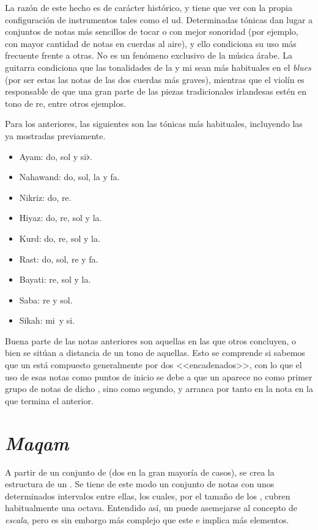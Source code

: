 La razón de este hecho es de carácter histórico, y tiene que ver con la propia configuración de instrumentos tales como el ud. Determinadas tónicas dan lugar a conjuntos de notas más sencillos de tocar o con mejor sonoridad (por ejemplo, con mayor cantidad de notas en cuerdas al aire), y ello condiciona su uso más frecuente frente a otras. No es un fenómeno exclusivo de la música árabe. La guitarra condiciona que las tonalidades de la y mi sean más habituales en el \emph{blues} (por ser estas las notas de las dos cuerdas más graves), mientras que el violín es responsable de que una gran parte de las piezas tradicionales irlandesas estén en tono de re, entre otros ejemplos.

Para los \ashnas anteriores, las siguientes son las tónicas más habituales, incluyendo las ya mostradas previamente.

\begin{center}
\begin{itemize}
\item Ayam: do, sol y si$\flat$.
\item Nahawand: do, sol, la y fa.
\item Nikriz: do, re.
\item Hiyaz: do, re, sol y la.
\item Kurd: do, re, sol y la.
\item Rast: do, sol, re y fa.
\item Bayati: re, sol y la.
\item Saba: re y sol.
\item Sikah: mi\hflat\ y si\hflat.
\end{itemize}
\end{center}

Buena parte de las notas anteriores son aquellas en las que otros \ashnas concluyen, o bien se sitúan a distancia de un tono de aquellas. Esto se comprende si sabemos que un \maqam está compuesto generalmente por dos \ashnas <<encadenados>>, con lo que el uso de esas notas como puntos de inicio se debe a que un \yins aparece no como primer grupo de notas de dicho \maqamb, sino como segundo, y arranca por tanto en la nota en la que termina el anterior.

\section{\emph{Maqam}}

A partir de un conjunto de \ashnas (dos en la gran mayoría de casos), se crea la estructura de un \maqamb. Se tiene de este modo un conjunto de notas con unos determinados intervalos entre ellas, los cuales, por el tamaño de los \ashnasb, cubren habitualmente una octava. Entendido así, un \maqam puede asemejarse al concepto de \emph{escala}, pero es sin embargo más complejo que este e implica más elementos.

